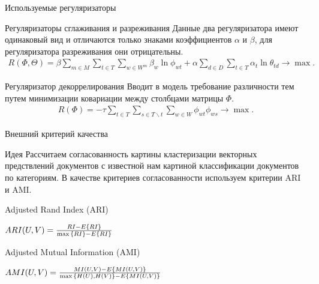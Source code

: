 \documentclass{beamer}
\begin{document}
\begin{frame}{Используемые регуляризаторы}
\begin{block}{Регуляризаторы сглаживания и разреживания}
	Данные два регуляризатора имеют одинаковый вид и отличаются только знаками коэффициентов $\alpha$ и $\beta$, для регуляризатора разреживания они отрицательны.
\begin{align*}
R(\Phi,\Theta)=\beta \sum_{m \in M}\sum_{t \in T}\sum_{w \in W^m} \beta_{w} \ln \phi_{wt} + \alpha \sum_{d \in D}\sum_{t \in T}\alpha_{t} \ln\theta_{td}\to \max.
\end{align*} 
    \end{block}
\begin{block}{Регуляризатор декоррелирования}
Вводит в модель требование различности тем путем минимизации ковариации между столбцами матрицы $\Phi$.
\begin{align*}
R(\Phi)=-\tau \sum_{t \in T}\sum_{s \in T\backslash t}\sum_{w \in W} \phi_{wt}\phi_{ws} \to \max.
\end{align*} 
    \end{block}
\end{frame}
\begin{frame}{Внешний критерий качества}
\begin{block}{Идея}
	Рассчитаем согласованность картины кластеризации векторных предствлений документов с известной нам картиной классификации документов по категориям. В качестве критериев согласованности используем критерии ARI и AMI.
    \end{block}
\begin{block}{Adjusted Rand Index (ARI)}
\begin{center}
	$ARI(U,V)={RI-E\{RI\}\over{\max{\{RI\}}-E\{RI\}}}$
\end{center}
    \end{block}
\begin{block}{Adjusted Mutual Information (AMI)}
\begin{center}
	$AMI(U,V)={MI(U,V)-E\{MI(U,V)\}\over{\max{\{H(U),H(V)\}}-E\{MI(U,V)\}}}$
\end{center} 
    \end{block}
\end{frame}
\end{document}
